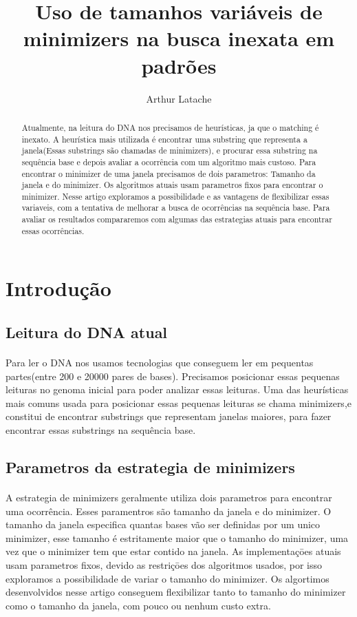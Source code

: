 \documentclass{article}
\begin{document}
\title{Uso de tamanhos variáveis de minimizers na busca inexata em padrões}
\author{Arthur Latache}

\maketitle
\begin{abstract}
Atualmente, na leitura do DNA nos precisamos de heurísticas, ja que o matching é inexato. A heurística mais utilizada é encontrar uma substring que representa a janela(Essas substrings são chamadas de minimizers), e procurar essa substring na sequência base e depois avaliar a ocorrência com um algoritmo mais custoso. Para encontrar o minimizer de uma janela precisamos de dois parametros: Tamanho da janela e do minimizer. Os algoritmos atuais usam parametros fixos para encontrar o minimizer. Nesse artigo exploramos a possibilidade e as vantagens de flexibilizar essas variaveis, com a tentativa de melhorar a busca de ocorrências na sequência base. Para avaliar os resultados compararemos com algumas das estrategias atuais para encontrar essas ocorrências.
\end{abstract}
\section{Introdução}
\subsection{Leitura do DNA atual}
\paragraph{}{Para ler o DNA nos usamos tecnologias que conseguem ler em pequentas partes(entre 200 e 20000 pares de bases). Precisamos posicionar essas pequenas leituras no genoma inicial para poder analizar essas leituras. Uma das heurísticas mais comuns usada para posicionar essas pequenas leituras se chama minimizers,e constitui de encontrar substrings que representam janelas maiores, para fazer encontrar essas substrings na sequência base.}
\subsection{Parametros da estrategia de minimizers}
\paragraph{}{A estrategia de minimizers geralmente utiliza dois parametros para encontrar uma ocorrência. Esses paramentros são tamanho da janela e do minimizer. O tamanho da janela especifica quantas bases vão ser definidas por um unico minimizer, esse tamanho é estritamente maior que o tamanho do minimizer, uma vez que o minimizer tem que estar contido na janela. As implementaçōes atuais usam parametros fixos, devido as restriçōes dos algoritmos usados, por isso exploramos a possibilidade de variar o tamanho do minimizer. Os algortimos desenvolvidos nesse artigo conseguem flexibilizar tanto to tamanho do minimizer como o tamanho da janela, com pouco ou nenhum custo extra.}
\end{document}
